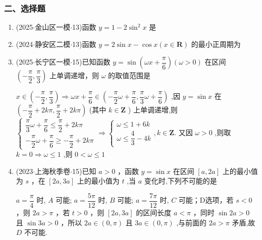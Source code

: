\subsubsection*{二、选择题}
\begin{enumerate}
    \item (2025$\cdot$金山区一模$\cdot$13)函数 $y = 1 - 2{\sin }^{2}x$ 是 
    \item (2024$\cdot$静安区二模$\cdot$13)函数 $y = 2\sin x - \cos x\left( {x \in  \mathbf{R}}\right)$ 的最小正周期为 

    \item (2025$\cdot$长宁区一模$\cdot$15)已知函数 $y = \sin \left( {{\omega x} + \dfrac{\pi }{6}}\right) \left( {\omega  > 0}\right)$ 在区间 $\left( {-\dfrac{\pi }{2},\dfrac{\pi }{3}}\right)$ 上单调递增，则 $\omega$ 的取值范围是 
    \begin{jieda}
        $x \in  \left( {-\dfrac{\pi }{2},\dfrac{\pi }{3}}\right)  \Longrightarrow  {\omega x} + \dfrac{\pi }{6} \in  \left( {-\dfrac{\pi }{2}\omega  + \dfrac{\pi }{6},\dfrac{\pi }{3}\omega  + }\right.  \left. \dfrac{\pi }{6}\right)$ ,因 $y = \sin x$ 在 $\left( {-\dfrac{\pi }{2} + {2k\pi },\dfrac{\pi }{2} + {2k\pi }}\right)$ (其中 $k \in  \mathbf{Z}$ ) 上单调递增,则 $\left\{  {\begin{array}{l} \dfrac{\pi }{3}\omega  + \dfrac{\pi }{6} \leq  \dfrac{\pi }{2} + {2k\pi } \\   - \dfrac{\pi }{2}\omega  + \dfrac{\pi }{6} \geq   - \dfrac{\pi }{2} + {2k\pi } \end{array} \Longrightarrow  \left\{  {\begin{array}{l} \omega  \leq  1 + {6k} \\  \omega  \leq  \dfrac{4}{3} - {4k} \end{array},k \in \mathbf{Z}}\right. }\right.$. 又因 $\omega  > 0$ ,则取 $k = 0 \Longrightarrow  \omega  \leq  1$ ,则 $0 < \omega  \leq  1$
    \end{jieda}

    \item (2023$\cdot$上海秋季卷$\cdot$15)已知 $a > 0$ ，函数 $y = \sin x$ 在区间 $\left\lbrack  {a,{2a}}\right\rbrack$ 上的最小值为 $s$ ，在 $\left\lbrack  {{2a},{3a}}\right\rbrack$ 上的最小值为 $t$ ,当 $a$ 变化时,下列不可能的是 
    \begin{jieda}
        $a = \dfrac{\pi }{4}$ 时, ${A}$ 可能; $a = \dfrac{5\pi }{12}$ 时, ${B}$ 可能; $a = \dfrac{7\pi }{12}$ 时, ${C}$ 可能；D选项，若 $s < 0$ ，则 ${2a} > \pi$ ，若 $t > 0$ ，则 $\left\lbrack  {{2a},{3a}}\right\rbrack$ 的区间长度 $a < \pi$ ，同时 $\sin {2a} > 0$ 且 $\sin {3a} > 0$ ，所以 ${2a} \in  \left( {0,\pi }\right)$ 且 ${3a} \in  \left( {0,\pi }\right)$ ,与前面的 ${2a} > \pi$ 矛盾,故 ${D}$ 不可能.
    \end{jieda}


\end{enumerate}
